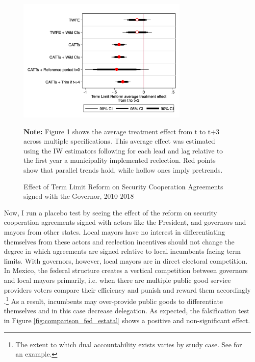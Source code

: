 \documentclass[12pt]{amsart}
\numberwithin{equation}{section}
\theoremstyle{definition}
\theoremstyle{definition}
\theoremstyle{definition}
\begin{document}
  
\begin{figure}[h]   
\centering
 \caption{Effect of Term Limit Reform on Security Cooperation Agreements signed with the Governor, 2010-2018}
 \label{fig:robustness_agreements}
\includegraphics[width=0.75\textwidth]{../Figures/average_effects.png}
       \captionsetup{justification=centering}
       
 \textbf{Note:} Figure \ref{fig:robustness_agreements} shows the average treatment effect from t to t+3 across multiple specifications. This average effect was estimated using the IW estimators following \citet{abraham_sun_2020} for each lead and lag relative to the first year a municipality implemented reelection. Red points show that parallel trends hold, while hollow ones imply pretrends. 
\end{figure}   

Now, I run a placebo test by seeing the effect of the reform on security cooperation agreements signed with actors like the President, and governors and mayors from other states. Local mayors have no interest in differentiating themselves from these actors and reelection incentives should not change the degree in which agreements are signed relative to local incumbents facing term limits. With governors, however, local mayors are in direct electoral competition. In Mexico, the federal structure creates a vertical competition between governors and local mayors primarily, i.e. when there are multiple public good service providers voters compare their efficiency and punish and reward them accordingly \citep{treisman_2000}.\footnote{The extent to which dual accountability exists varies by study case. See \citet{rodden_2010} for an example.} As a result, incumbents may over-provide public goods to differentiate themselves \citep{salmon_1987, Breton_1996, treisman_2000} and in this case decrease delegation. As expected,  the falsification test in Figure \ref{fig:comparison_fed_estatal} shows a positive and non-significant effect. 
    
\end{document}
